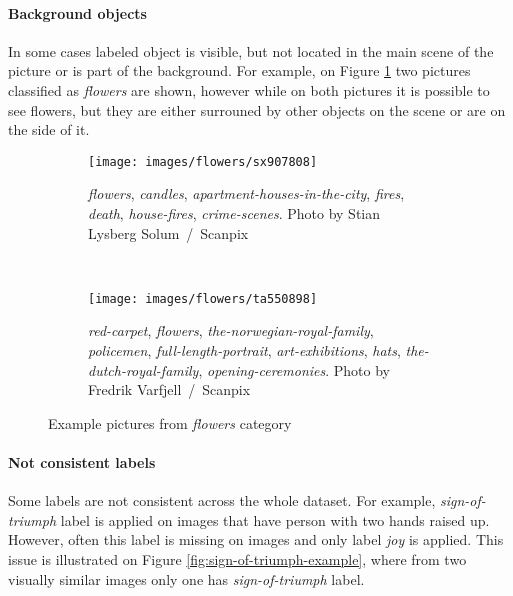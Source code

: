 \paragraph{Background objects}
In some cases labeled object is visible, but not located in the main scene of the picture or is part of the background. For example, on Figure \ref{fig:image-flowers} two pictures classified as \textit{flowers} are shown, however while on both pictures it is possible to see flowers, but they are either surrouned by other objects on the scene or are on the side of it.

\begin{figure}[ht!]
    \centering
    \begin{subfigure}[a]{0.45\textwidth}
        \texttt{[image: images/flowers/sx907808]}
        \caption{\textit{flowers}, \textit{candles}, \textit{apartment-houses-in-the-city}, \textit{fires}, \textit{death}, \textit{house-fires}, \textit{crime-scenes}. Photo by Stian Lysberg Solum~/~Scanpix}
    \end{subfigure}
    ~
    \begin{subfigure}[a]{0.45\textwidth}
        \texttt{[image: images/flowers/ta550898]}
        \caption{\textit{red-carpet}, \textit{flowers}, \textit{the-norwegian-royal-family}, \textit{policemen}, \textit{full-length-portrait}, \textit{art-exhibitions}, \textit{hats}, \textit{the-dutch-royal-family}, \textit{opening-ceremonies}. Photo by Fredrik Varfjell~/~Scanpix}
    \end{subfigure}
    \caption{Example pictures from \textit{flowers} category}
    \label{fig:image-flowers}
\end{figure}


\paragraph{Not consistent labels}
Some labels are not consistent across the whole dataset. For example, \textit{sign-of-triumph} label is applied on images that have person with two hands raised up. However, often this label is missing on images and only label \textit{joy} is applied. This issue is illustrated on Figure \ref{fig:sign-of-triumph-example}, where from two visually similar images only one has \textit{sign-of-triumph} label.

